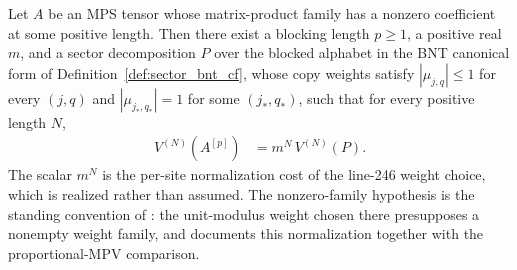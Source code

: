 \begin{lemma}%
    \label{thm:paperbnt_supplier_after_blocking_normalized}
    \leanok
    Let $A$ be an MPS tensor whose matrix-product family has a nonzero
    coefficient at some positive length. Then there exist a blocking length
    $p\geq1$, a positive real $m$, and a sector decomposition $P$ over the
    blocked alphabet in the BNT canonical form of
    Definition~\ref{def:sector_bnt_cf}, whose copy weights satisfy
    $|\mu_{j,q}|\le1$ for every $(j,q)$ and $|\mu_{j_*,q_*}|=1$ for some
    $(j_*,q_*)$, such that for every positive length $N$,
    \begin{align}
        V^{(N)}(A^{[p]})
         & =m^{N}\,V^{(N)}(P).
        \label{eq:bnt_sector_normalized_family}
    \end{align}
    The scalar $m^{N}$ is the per-site normalization cost of the line-246
    weight choice, which is realized rather than assumed. The nonzero-family
    hypothesis is the standing convention of
    \cite[Section~2.3]{Cirac2016MPDO_arXiv}: the unit-modulus weight chosen
    there presupposes a nonempty weight family, and
    \cite{gap:cpsv16_cf_normalization_and_proportional_comparison} documents
    this normalization together with the proportional-MPV comparison.
\end{lemma}

